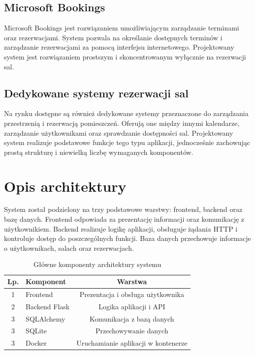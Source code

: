 \documentclass[times]{san}
\begin{document}
\subsection{Microsoft Bookings}
Microsoft Bookings jest rozwiązaniem umożliwiającym zarządzanie terminami oraz rezerwacjami. System pozwala na określanie dostępnych terminów i zarządzanie rezerwacjami za pomocą interfejsu internetowego.
Projektowany system jest rozwiązaniem prostszym i skoncentrowanym wyłącznie na rezerwacji sal.


\subsection{Dedykowane systemy rezerwacji sal}
Na rynku dostępne są również dedykowane systemy przeznaczone do zarządzania przestrzenią i rezerwacją pomieszczeń. Oferują one między innymi kalendarze, zarządzanie użytkownikami oraz sprawdzanie dostępności sal.
Projektowany system realizuje podstawowe funkcje tego typu aplikacji, jednocześnie zachowując prostą strukturę i niewielką liczbę wymaganych komponentów.




\section{Opis architektury}

System został podzielony na trzy podstawowe warstwy: frontend, backend oraz bazę danych.
Frontend odpowiada za prezentację informacji oraz komunikację z użytkownikiem. Backend realizuje logikę aplikacji, obsługuje żądania HTTP i kontroluje dostęp do poszczególnych funkcji. Baza danych przechowuje informacje o użytkownikach, salach oraz rezerwacjach.


\begin{table}[h]
\centering
\caption{Główne komponenty architektury systemu}
\label{tab:lorem}
\begin{tabular}{|c|l|c|}
\hline
Lp. & Komponent          & Warstwa \\
\hline
1   & Frontend        & Prezentacja i obsługa użytkownika   \\
2   & Backend Flask      & Logika aplikacji i API \\
3   & SQLAlchemy      & Komunikacja z bazą danych     \\
3   & SQLite      & Przechowywanie danych    \\
3   & Docker     & Uruchamianie aplikacji w kontenerze    \\
\hline
\end{tabular}
\end{table}
\end{document}
